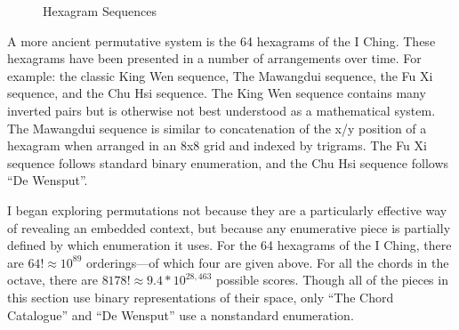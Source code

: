\documentclass{thesis}
\begin{document}
\begin{figure}
  \begin{center}
  	\setlength\fboxsep{12pt}
		\setlength\fboxrule{0pt}
	  \caption{Hexagram Sequences}
	  \label{hexagrams}
  \end{center}
\end{figure}

A more ancient permutative system is the 64 hexagrams of the I Ching. These hexagrams have been presented in a number of arrangements over time. For example: the classic King Wen sequence, The Mawangdui sequence, the Fu Xi sequence, and the Chu Hsi sequence. The King Wen sequence contains many inverted pairs but is otherwise not best understood as a mathematical system. The Mawangdui sequence is similar to concatenation of the x/y position of a hexagram when arranged in an 8x8 grid and indexed by trigrams. The Fu Xi sequence follows standard binary enumeration, and the Chu Hsi sequence follows ``De Wensput''.

I began exploring permutations not because they are a particularly effective way of revealing an embedded context, but because any enumerative piece is partially defined by which enumeration it uses. For the 64 hexagrams of the I Ching, there are $64!\approx10^{89}$ orderings---of which four are given above. For all the chords in the octave, there are $8178!\approx9.4*10^{28,463}$ possible scores. Though all of the pieces in this section use binary representations of their space, only ``The Chord Catalogue'' and ``De Wensput'' use a nonstandard enumeration.
\end{document}
